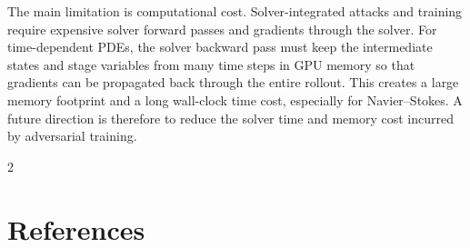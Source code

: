 \documentclass[letterpaper]{article} %
\begin{document}
The main limitation is computational cost. Solver-integrated attacks and
training require expensive solver forward passes and gradients through the
solver. For time-dependent PDEs, the solver backward pass must keep the
intermediate states and stage variables from many time steps in GPU memory so
that gradients can be propagated back through the entire rollout. This creates a
large memory footprint and a long wall-clock time cost, especially for
Navier--Stokes.
A future direction is therefore to reduce the solver time and memory cost
incurred by adversarial training.
\clearpage
\onecolumn
\begingroup
\makeatletter
\renewcommand{\bibsection}{}%
\renewcommand{\bibfont}{\fontsize{9.4pt}{10.45pt}\selectfont}%
\let\paperorigthebibliography\thebibliography
\renewcommand{\thebibliography}[1]{%
  \paperorigthebibliography{#1}%
  \setlength{\bibsep}{0pt}%
  \setlength{\itemsep}{0pt}%
  \setlength{\parsep}{0pt}%
  \setlength{\parskip}{0pt}%
  \setlength{\topsep}{0pt}%
  \setlength{\partopsep}{0pt}%
}
\makeatother
\begin{multicols}{2}
\section*{References}
\vspace{-0.4em}

\end{multicols}
\endgroup
\end{document}

